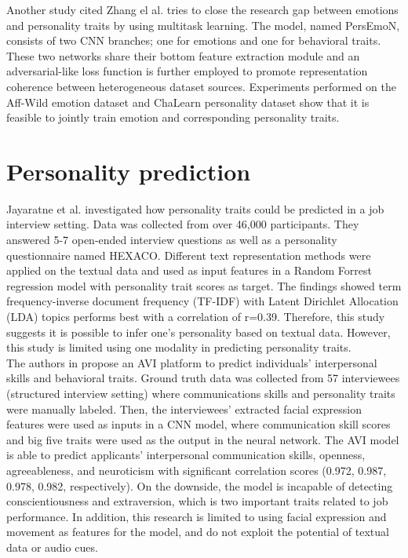 Another study cited Zhang el al. \cite{personality-emotion2-8897617} tries to close the research gap between emotions and personality traits by using multitask learning. The model, named PersEmoN, consists of two CNN branches; one for emotions and one for behavioral traits. These two networks share their bottom feature extraction module and an adversarial-like loss function is further employed to promote representation coherence between heterogeneous dataset sources. Experiments performed on the Aff-Wild emotion dataset and ChaLearn personality dataset show that it is feasible to jointly train emotion and corresponding personality traits. 

\section{Personality prediction}
\label{sec:personality_prediction}
Jayaratne et al. \cite{personality-prediction-questions-9121971} investigated how personality traits could be predicted in a job interview setting. Data was collected from over 46,000 participants. They answered 5-7 open-ended interview questions as well as a personality questionnaire named HEXACO. Different text representation methods were applied on the textual data and used as input features in a Random Forrest regression model with personality trait scores as target. The findings showed term frequency-inverse document frequency (TF-IDF) with Latent Dirichlet Allocation (LDA) topics performs best with a correlation of r=0.39. Therefore, this study suggests it is possible to infer one's personality based on textual data. However, this study is limited using one modality in predicting personality traits.  \\ 

The authors in \cite{video-interview3-suen2020intelligent} propose an AVI platform to predict individuals' interpersonal skills and behavioral traits. Ground truth data was collected from 57 interviewees (structured interview setting) where communications skills and personality traits were manually labeled. Then, the interviewees’ extracted facial expression features were used as inputs in a CNN model, where communication skill scores and big five traits were used as the output in the neural network. The AVI model is able to predict applicants' interpersonal communication skills, openness, agreeableness, and neuroticism with significant correlation scores (0.972, 0.987, 0.978, 0.982, respectively). On the downside, the model is incapable of detecting conscientiousness and extraversion, which is two important traits related to job performance. In addition, this research is limited to using facial expression and movement as features for the model, and do not exploit the potential of textual data or audio cues. \\

